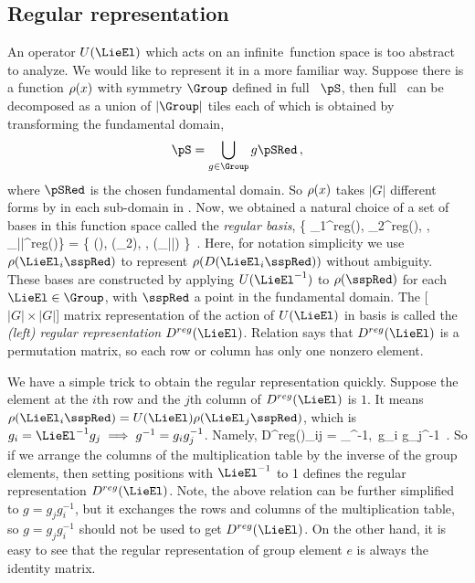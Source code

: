 
\subsection{Regular representation}
An operator $U(\LieEl)$ which acts on an infinite\dmn\ function space
is too abstract to analyze.
We would like to represent it in a more familiar way.
Suppose there is a function $\rho(x)$ with symmetry $\Group$ defined in full
\statesp\ $\pS$, then full \statesp\ can be decomposed as a union
of $|\Group|$ tiles each of which is obtained by transforming the fundamental
domain,
\begin{equation}
  \label{eq:domain}
  \pS =  \bigcup_{g\in \Group}g\pSRed
  \,,
\end{equation}
where $\pSRed$ is the chosen fundamental domain.
So $\rho(x)$ takes $|G|$ different forms by  in each sub-domain
in . Now, we obtained a natural choice of a set of bases in this
function space called the \emph{regular basis},
\beq
\label{eq:RegBasis}
\{ \rho_1^{reg}(\sspRed), \rho_2^{reg}(\sspRed), %
\cdots, \rho_{|\Group|}^{reg}(\sspRed)\}
=
\{
\rho(\sspRed), \rho(\LieEl_2\sspRed), %
\cdots, \rho(\LieEl_{|\Group|}\sspRed) \}
\,.
\eeq
Here, for notation simplicity we use
$\rho(\LieEl_i\sspRed)$ to represent $\rho(D(\LieEl_i\sspRed))$ without
ambiguity.
These bases are
constructed by applying $U(\LieEl^{-1})$ to $\rho(\sspRed)$ for each
$\LieEl\in\Group$, with $\sspRed$ a point in the fundamental domain.
The [$|G|\!\times\!|G|$] matrix representation of the
action of $U(\LieEl)$ in basis  is called the \emph{(left)
regular representation} $D^{reg}(\LieEl)$. Relation  says that
$D^{reg}(\LieEl)$ is a permutation matrix, so each row or column has only one nonzero
element.

We have a simple trick to obtain the regular representation quickly.
Suppose the element at the $i$th row and
the $j$th column of $D^{reg}(\LieEl)$
is $1$. It means
$\rho(\LieEl_i\sspRed) = U(\LieEl) \rho(\LieEl_j\sspRed)$, which
is $g_i=\LieEl^{-1}g_j \implies g^{-1} = g_i g_j^{-1}$. Namely,
\beq
D^{reg}(\LieEl)_{ij} = \delta_{\LieEl^{-1},\, g_i g_j^{-1}}
\,.
So if we arrange the
columns of the multiplication table by the inverse of the group elements,
then setting positions with $\LieEl^{-1}$ to 1 defines the regular
representation $D^{reg}(\LieEl)$. Note, the above relation can
be further simplified to $g = g_jg_i^{-1}$, but it exchanges the rows and
columns of the multiplication table, so $g = g_jg_i^{-1}$
should not be used to get $D^{reg}(\LieEl)$.
On the other hand, it is easy to see
that the regular representation of group element $e$ is always the identity matrix.

